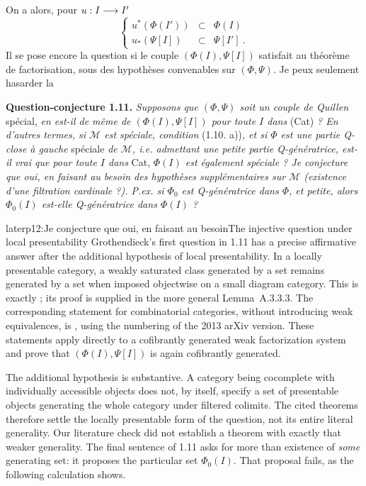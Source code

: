 On a alors, pour $u : I \longrightarrow I'$
\[
\left\{
\begin{array}{rcl}
u^{*}(\Phi(I')) & \subset & \Phi(I) \\
u_{*}(\Psi[I]) & \subset & \Psi[I']\ .
\end{array}
\right.
\tag*{(1.22)}
\]
Il se pose encore la question si le couple $(\Phi(I), \Psi[I])$ satisfait au théorème de factorisation, sous des hypothèses convenables sur $(\Phi, \Psi)$. Je peux seulement hasarder la

\textbf{Question-conjecture 1.11.} \textit{Supposons que $(\Phi, \Psi)$ soit un couple de Quillen} spécial, \textit{en est-il de même de $(\Phi(I), \Psi[I])$ pour toute $I$ dans} (Cat) \textit{? En d'autres termes, si $\mathcal{M}$ est spéciale, condition} (1.10. a))\textit{, et si $\Phi$ est une partie Q-close à gauche} spéciale \textit{de $\mathcal{M}$, i.e. admettant une petite partie Q-génératrice, est-il vrai que pour toute $I$ dans} Cat, \textit{$\Phi(I)$ est également spéciale ? Je conjecture que oui, en faisant au besoin des hypothèses supplémentaires sur $\mathcal{M}$ (existence d'une filtration cardinale ?). P.ex. si $\Phi_0$ est Q-génératrice dans $\Phi$, et petite, alors $\Phi_0(I)$ est-elle Q-génératrice dans $\Phi(I)$ ?}

\begin{dcomment}{later}{p12:Je conjecture que oui, en faisant au besoin}{The injective question under local presentability}
Grothendieck's first question in 1.11 has a precise affirmative answer after the additional hypothesis of local presentability. In a locally presentable category, a weakly saturated class generated by a set remains generated by a set when imposed objectwise on a small diagram category. This is exactly \citet[Lemma~A.2.8.3]{Lurie2009HTT}; its proof is supplied in the more general Lemma~A.3.3.3. The corresponding statement for combinatorial categories, without introducing weak equivalences, is \citet[Corollary~3.4]{MakkaiRosicky2014}, using the numbering of the 2013 arXiv version. These statements apply directly to a cofibrantly generated weak factorization system and prove that $(\Phi(I),\Psi[I])$ is again cofibrantly generated.

The additional hypothesis is substantive. A category being cocomplete with individually accessible objects does not, by itself, specify a set of presentable objects generating the whole category under filtered colimits. The cited theorems therefore settle the locally presentable form of the question, not its entire literal generality. Our literature check did not establish a theorem with exactly that weaker generality. The final sentence of 1.11 asks for more than existence of \emph{some} generating set: it proposes the particular set $\Phi_0(I)$. That proposal fails, as the following calculation shows.
\end{dcomment}


